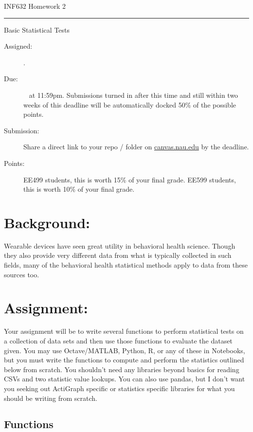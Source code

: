 \documentclass[11pt]{article}
\begin{document}


\Huge INF632 Homework 2
\normalsize ~

\noindent\rule{\textwidth}{1pt}\vspace{.5em}

\LARGE Basic Statistical Tests
\normalsize ~

\begin{description}
	\item [Assigned:] \wkThreeTh.
	\item [Due:] \wkSixTh~ at 11:59pm. Submissions turned in after this time and still within two weeks of this deadline will be automatically docked 50\% of the possible points. %
	\item [Submission:]Share a direct link to your repo / folder on \href{https://canvas.nau.edu}{canvas.nau.edu} by the deadline.
	\item [Points:] EE499 students, this is worth 15\% of your final grade.  EE599 students, this is worth 10\% of your final grade.
\end{description}

\section*{Background:}
Wearable devices have seen great utility in behavioral health science. Though they also provide very different data from what is typically collected in such fields, many of the behavioral health statistical methods apply to data from these sources too.

\section*{Assignment:}
Your assignment will be to write several functions to perform statistical tests on a collection of data sets and then use those functions to evaluate the dataset given. You may use Octave/MATLAB, Python, R, or any of these in Notebooks, but you must write the functions to compute and perform the statistics outlined below from scratch.  You shouldn't need any libraries beyond basics for reading CSVs and two statistic value lookups.  You can also use pandas, but I don't want you seeking out ActiGraph specific or statistics specific libraries for what you should be writing from scratch.

\subsection*{Functions}
\end{document}
